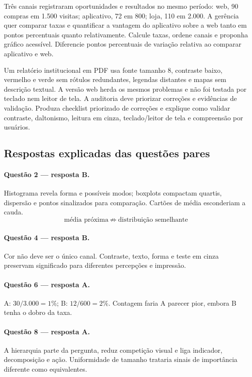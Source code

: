 \TextoBase Três canais registraram oportunidades e resultados no mesmo período: web, 90 compras em 1.500 visitas; aplicativo, 72 em 800; loja, 110 em 2.000. A gerência quer comparar taxas e quantificar a vantagem do aplicativo sobre a web tanto em pontos percentuais quanto relativamente.
\FonteDidatica
\Comando Calcule taxas, ordene canais e proponha gráfico acessível. Diferencie pontos percentuais de variação relativa ao comparar aplicativo e web.

\TextoBase Um relatório institucional em PDF usa fonte tamanho 8, contraste baixo, vermelho e verde sem rótulos redundantes, legendas distantes e mapas sem descrição textual. A versão web herda os mesmos problemas e não foi testada por teclado nem leitor de tela. A auditoria deve priorizar correções e evidências de validação.
\FonteDidatica
\Comando Produza checklist priorizado de correções e explique como validar contraste, daltonismo, leitura em cinza, teclado/leitor de tela e compreensão por usuários.

\newpage\subsection{Respostas explicadas das questões pares}
\paragraph{Questão 2 — resposta B.} Histograma revela forma e possíveis modos; boxplots compactam quartis, dispersão e pontos sinalizados para comparação. Cartões de média esconderiam a cauda.
\[\text{média próxima}\ \not\Rightarrow\ \text{distribuição semelhante}\]
\paragraph{Questão 4 — resposta B.} Cor não deve ser o único canal. Contraste, texto, forma e teste em cinza preservam significado para diferentes percepções e impressão.
\paragraph{Questão 6 — resposta A.} A: $30/3.000=1\%$; B: $12/600=2\%$. Contagem faria A parecer pior, embora B tenha o dobro da taxa.
\paragraph{Questão 8 — resposta A.} A hierarquia parte da pergunta, reduz competição visual e liga indicador, decomposição e ação. Uniformidade de tamanho trataria sinais de importância diferente como equivalentes.
